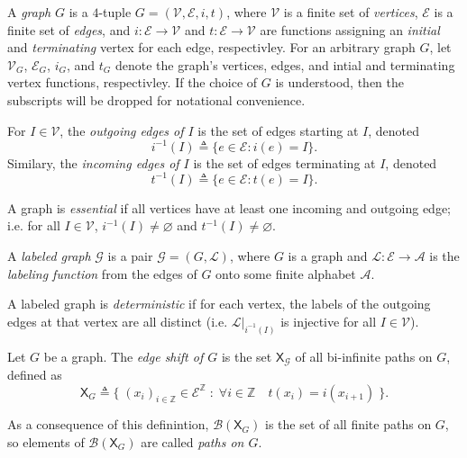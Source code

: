 \documentclass{article}
\newcommand{\Ac}{\mathcal{A}}  %
\newcommand{\Lc}{\mathcal{L}}  %
\newcommand{\Gc}{\mathcal{G}}  %
\newcommand{\Vc}{\mathcal{V}}
\newcommand{\Ec}{\mathcal{E}}
\newcommand{\Bc}{\mathcal{B}}
\newcommand{\shift}[1]{\mathsf{X}_{#1}}
\newcommand{\term}[1]{\textit{#1}}
\theoremstyle{definition}
\begin{document}
\begin{definition}
    A \term{graph} \(G\) is a \(4\)-tuple \(G = (\Vc, \Ec, i, t)\), where \(\Vc\) is a finite 
    set of \term{vertices}, \(\Ec\) is a finite set of \term{edges}, and \(i : \Ec \to \Vc\) and 
    \(t : \Ec \to \Vc\) are functions assigning an \term{initial} and \term{terminating} vertex for 
    each edge, respectivley. For an arbitrary graph \(G\), let 
    \(\Vc_G\), \(\Ec_G\), \(i_G\), and \(t_G\) denote the graph's vertices, edges, and 
    intial and terminating vertex functions, respectivley. If the choice 
    of \(G\) is understood, then the subscripts will be dropped for notational convenience.

    For \(I \in \Vc\), the \term{outgoing edges of \(I\)} is the set of edges starting at \(I\),
    denoted 
    \[i^{-1}(I) \triangleq \{e \in \Ec : i(e) = I\}.\]
    Similary, the \term{incoming edges of \(I\)} is the set of edges terminating at \(I\), 
    denoted
    \[t^{-1}(I) \triangleq \{e \in \Ec : t(e) = I\}.\]

    A graph is \term{essential} if all vertices have at least one incoming and outgoing edge;
    i.e. for all \(I \in \Vc\), \(i^{-1}(I) \ne \varnothing\) and \(t^{-1}(I) \ne \varnothing\).

\end{definition}

\begin{definition}
    A \term{labeled graph} \(\Gc\) is a pair \(\Gc = (G, \Lc)\), where \(G\) is a graph and \(\Lc : \Ec \to \Ac\) is the 
    \term{labeling function} from the edges of \(G\) onto some finite alphabet \(\Ac\).

    A labeled graph is \term{deterministic} if for each vertex, the labels of the outgoing edges at that vertex are all distinct 
    (i.e. \(\Lc|_{i^{-1}(I)}\) is injective for all \(I \in \Vc\)).
\end{definition}

\begin{definition}
    Let \(G\) be a graph. The \term{edge shift of \(G\)} is the set \(\shift{\Gc}\) of all bi-infinite 
    paths on \(G\), defined as 
    \[\shift{G} \triangleq \Big\{ \; (x_i)_{i \in \mathbb{Z}} \in \Ec^\mathbb{Z} \; : \; \forall i \in \mathbb{Z} \quad t(x_i) = i(x_{i+1}) \; \Big\}. \]
\end{definition}

\noindent As a consequence of this definintion, \(\Bc(\shift{G})\) is the 
set of all finite paths on \(G\), so elements of \(\Bc(\shift{G})\) are called
\term{paths on \(G\)}.
\end{document}

